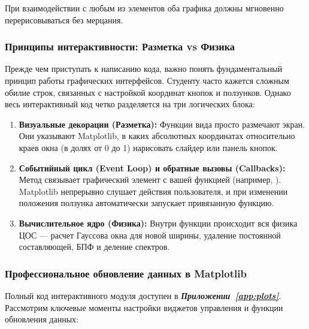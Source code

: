 При взаимодействии с любым из элементов оба графика должны мгновенно перерисовываться без мерцания.

\subsubsection{Принципы интерактивности: Разметка vs Физика}

Прежде чем приступать к написанию кода, важно понять фундаментальный принцип работы графических интерфейсов. Студенту часто кажется сложным обилие строк, связанных с настройкой координат кнопок и ползунков. Однако весь интерактивный код четко разделяется на три логических блока:
\begin{enumerate}
    \item \textbf{Визуальные декорации (Разметка):} Функции вида  просто размечают экран. Они указывают Matplotlib, в каких абсолютных координатах относительно краев окна (в долях от 0 до 1) нарисовать слайдер или панель кнопок.
    \item \textbf{Событийный цикл (Event Loop) и обратные вызовы (Callbacks):} Метод  связывает графический элемент с вашей функцией (например, ). Matplotlib непрерывно слушает действия пользователя, и при изменении положения ползунка автоматически запускает привязанную функцию.
    \item \textbf{Вычислительное ядро (Физика):} Внутри функции  происходит вся физика ЦОС --- расчет Гауссова окна для новой ширины, удаление постоянной составляющей, БПФ и деление спектров.
\end{enumerate}

\subsubsection{Профессиональное обновление данных в Matplotlib}


Полный код интерактивного модуля доступен в \textbf{\textit{Приложении~\ref{app:plots}}}. Рассмотрим ключевые моменты настройки виджетов управления и функции обновления данных:

